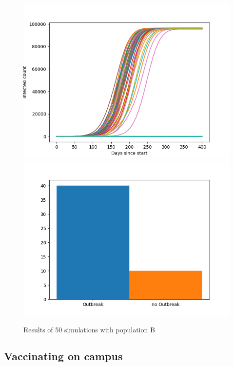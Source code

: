 \documentclass[runningheads]{llncs}
\begin{document}
\begin{figure}
	\includegraphics[width=\textwidth]{outbreaks_populationB.png}
	\includegraphics[width=\textwidth]{barchart_populationB.png}
	\caption{Results of 50 simulations with population B}
\end{figure}
\newpage
\noindent
\subsection{Vaccinating on campus}
\newpage
\end{document}
